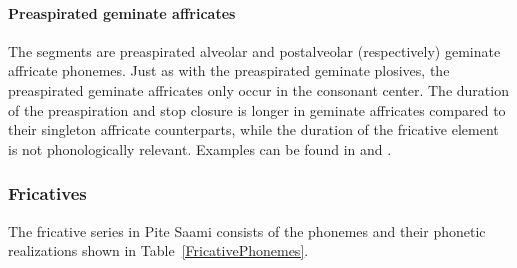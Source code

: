 \paragraph{Preaspirated geminate affricates}
The segments \mbox{} are preaspirated alveolar and postalveolar (respectively) geminate affricate phonemes. 
Just as with the preaspirated geminate plosives, the preaspirated geminate affricates only occur in the consonant center. The duration of the preaspiration and stop closure is longer in geminate affricates compared to their singleton affricate counterparts, while the duration of the fricative element is not phonologically relevant. 
Examples can be found in  and .

\subsubsection{Fricatives}\label{Fricatives}
The fricative series in Pite Saami consists of the phonemes and their phonetic realizations shown in Table~\vref{FricativePhonemes}. %

